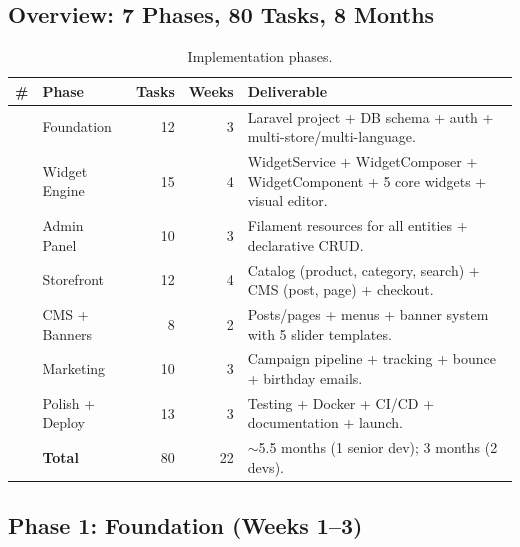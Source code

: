 \documentclass[11pt,a4paper]{article}
\begin{document}
\subsection{Overview: 7 Phases, 80 Tasks, 8 Months}

\begin{table}[htbp]
\centering
\caption{Implementation phases.}\label{tab:phases}
\footnotesize\sloppy
\begin{tabularx}{\columnwidth}{>{\raggedright\arraybackslash}p{1.0cm}lrrX}
\toprule
\# & \textbf{Phase} & \textbf{Tasks} & \textbf{Weeks} & \textbf{Deliverable} \\
\midrule
1 & Foundation & 12 & 3 & Laravel project + DB schema + auth + multi-store/multi-language. \\
2 & Widget Engine & 15 & 4 & WidgetService + WidgetComposer + WidgetComponent + 5 core widgets + visual editor. \\
3 & Admin Panel & 10 & 3 & Filament resources for all entities + declarative CRUD. \\
4 & Storefront & 12 & 4 & Catalog (product, category, search) + CMS (post, page) + checkout. \\
5 & CMS + Banners & 8 & 2 & Posts/pages + menus + banner system with 5 slider templates. \\
6 & Marketing & 10 & 3 & Campaign pipeline + tracking + bounce + birthday emails. \\
7 & Polish + Deploy & 13 & 3 & Testing + Docker + CI/CD + documentation + launch. \\
\midrule
 & \textbf{Total} & 80 & 22 & $\sim$5.5 months (1 senior dev); 3 months (2 devs). \\
\bottomrule
\end{tabularx}
\end{table}

\subsection{Phase 1: Foundation (Weeks 1--3)}
\end{document}
